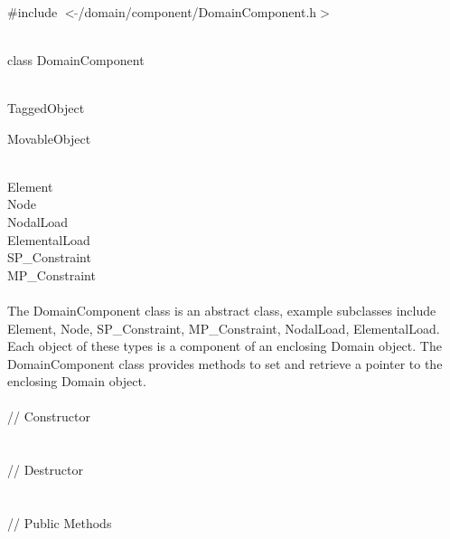
   \\
\#include $<\tilde{ }$/domain/component/DomainComponent.h$>$  


  \\
class DomainComponent 


 \\
 TaggedObject 

 MovableObject 

\indent{} \\
\indent\indent\indent  Element \\
\indent\indent\indent  Node \\
\indent\indent\indent  NodalLoad \\
\indent\indent\indent  ElementalLoad \\
\indent\indent\indent  SP\_Constraint \\
\indent\indent\indent  MP\_Constraint \\

  \\
\indent The DomainComponent class is an abstract class, example
subclasses include Element, Node, SP\_Constraint, MP\_Constraint,
NodalLoad, ElementalLoad. Each object of these types is a component of
an enclosing Domain object. The DomainComponent class provides methods
to set and retrieve a pointer to the enclosing Domain object. \\

  \\
\indent\indent // Constructor  \\
\indent{}  \\ \\
\indent\indent // Destructor  \\
\indent{}  \\ \\
\indent\indent // Public Methods  \\
\indent{} \\
\indent{}\\
\indent{} \\

